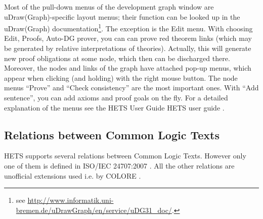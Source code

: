 \documentclass{article}
\newcommand{\normalTEXTSC}[2]{{#1\scriptsize#2}}
\newcommand     {\Hets}{\normalTEXTSC{H}{ETS}\xspace}
\begin{document}
Most of the pull-down menus of the development graph window are
uDraw(Graph)-specific layout menus; their function can be looked up in
the uDraw(Graph) documentation\footnote{see
  \url{http://www.informatik.uni-bremen.de/uDrawGraph/en/service/uDG31\_doc/}.}.
The exception is the Edit menu. 
With choosing Edit, Proofs, Auto-DG prover, you can can prove red theorem
links (which may be generated by relative interpretations of theories).
Actually, this will generate new proof obligations at some node,
which then can be discharged there.
Moreover, the nodes and links of the
graph have attached pop-up menus, which appear when clicking (and
holding) with the right mouse button. 
The node menus ``Prove'' and ``Check consistency'' are the most
important ones. With ``Add sentence'', you can add axioms and
proof goals on the fly.
For a detailed explanation of the menus
see the \Hets User Guide \Hets user guide \cite{HetsUserGuide}.

\subsection{Relations between Common Logic Texts}
\label{relationsInCL}
\Hets supports several relations between Common Logic Texts. However only one of
them is defined in ISO/IEC 24707:2007 \cite{iso24a}. All the other relations are 
unofficial extensions used i.e. by COLORE \cite{Colore}.
\end{document}
